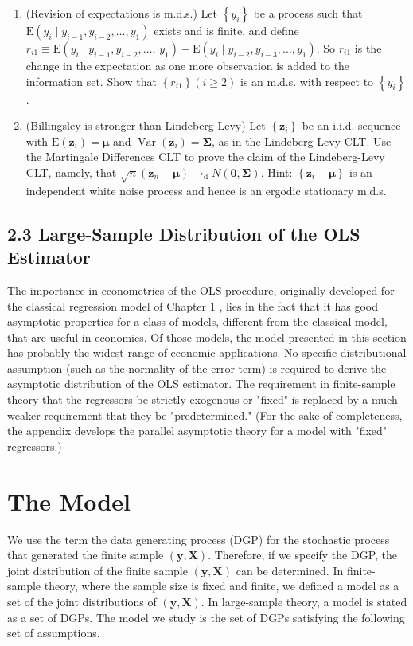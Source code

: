 \documentclass[10pt]{article}
\begin{document}
\begin{enumerate}
  \item (Revision of expectations is m.d.s.) Let $\left\{y_{i}\right\}$ be a process such that $\mathrm{E}\left(y_{i} \mid\right. \left.y_{i-1}, y_{i-2}, \ldots, y_{1}\right)$ exists and is finite, and define $r_{i 1} \equiv \mathrm{E}\left(y_{i} \mid y_{i-1}, y_{i-2}, \ldots\right.$, $\left.y_{1}\right)-\mathrm{E}\left(y_{i} \mid y_{i-2}, y_{i-3}, \ldots, y_{1}\right)$. So $r_{i 1}$ is the change in the expectation as one more observation is added to the information set. Show that $\left\{r_{i 1}\right\}(i \geq 2)$ is an m.d.s. with respect to $\left\{y_{i}\right\}$.
  \item (Billingsley is stronger than Lindeberg-Levy) Let $\left\{\mathbf{z}_{i}\right\}$ be an i.i.d. sequence with $\mathrm{E}\left(\mathbf{z}_{i}\right)=\boldsymbol{\mu}$ and $\operatorname{Var}\left(\mathbf{z}_{i}\right)=\boldsymbol{\Sigma}$, as in the Lindeberg-Levy CLT. Use the Martingale Differences CLT to prove the claim of the Lindeberg-Levy CLT, namely, that $\sqrt{n}\left(\overline{\mathbf{z}}_{n}-\boldsymbol{\mu}\right) \rightarrow_{\mathrm{d}} N(\mathbf{0}, \boldsymbol{\Sigma})$. Hint: $\left\{\mathbf{z}_{i}-\boldsymbol{\mu}\right\}$ is an independent white noise process and hence is an ergodic stationary m.d.s.
\end{enumerate}

\subsection*{2.3 Large-Sample Distribution of the OLS Estimator}
The importance in econometrics of the OLS procedure, originally developed for the classical regression model of Chapter 1 , lies in the fact that it has good asymptotic properties for a class of models, different from the classical model, that are useful in economics. Of those models, the model presented in this section has probably the widest range of economic applications. No specific distributional assumption (such as the normality of the error term) is required to derive the asymptotic distribution of the OLS estimator. The requirement in finite-sample theory that the regressors be strictly exogenous or "fixed" is replaced by a much weaker requirement that they be "predetermined." (For the sake of completeness, the appendix develops the parallel asymptotic theory for a model with "fixed" regressors.)

\section*{The Model}
We use the term the data generating process (DGP) for the stochastic process that generated the finite sample $(\mathbf{y}, \mathbf{X})$. Therefore, if we specify the DGP, the joint distribution of the finite sample $(\mathbf{y}, \mathbf{X})$ can be determined. In finite-sample theory, where the sample size is fixed and finite, we defined a model as a set of the joint distributions of $(\mathbf{y}, \mathbf{X})$. In large-sample theory, a model is stated as a set of DGPs. The model we study is the set of DGPs satisfying the following set of assumptions.
\end{document}
